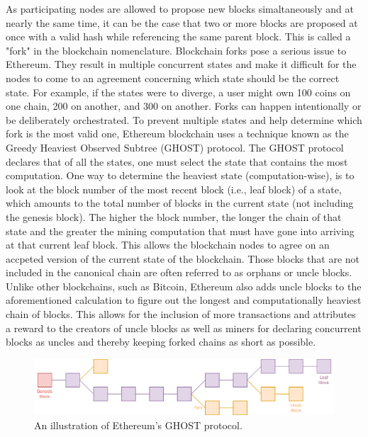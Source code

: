     As participating nodes are allowed to propose new blocks simaltaneously and at nearly the same time, it can be the case that two or more blocks are proposed at once with a valid
    hash while referencing the same parent block.
    This is called a "fork" in the blockchain nomenclature.
    Blockchain forks pose a serious issue to Ethereum.
    They result in multiple concurrent states and make it difficult for the nodes to come to an agreement concerning which state should be the correct state.
    For example, if the states were to diverge, a user might own 100 coins on one chain, 200 on another, and 300 on another.
    Forks can happen intentionally or be deliberately orchestrated.
    To prevent multiple states and help determine which fork is the most valid one, Ethereum blockchain uses a technique known as the Greedy Heaviest Observed Subtree (GHOST) protocol.
    The GHOST protocol declares that of all the states, one must select the state that contains the most computation.
    One way to determine the heaviest state (computation-wise), is to look at the block number of the most recent block (i.e., leaf block) of a state, which amounts to the total
    number of blocks in the current state (not including the genesis block).
    The higher the block number, the longer the chain of that state and the greater the mining computation that must have gone into arriving at that current leaf block.
    This allows the blockchain nodes to agree on an accpeted version of the current state of the blockchain.
    Those blocks that are not included in the canonical chain are often referred to as orphans or uncle blocks.
    Unlike other blockchains, such as Bitcoin, Ethereum also adds uncle blocks to the aforementioned calculation to figure out the longest and computationally heaviest chain of blocks.
    This allows for the inclusion of more transactions and attributes a reward to the creators of uncle blocks as well as miners for declaring concurrent blocks as uncles and
    thereby keeping forked chains as short as possible.

    \begin{figure}
        \centering
        \includegraphics[width=\textwidth]{figures/uncle.png}
        \caption{An illustration of Ethereum's GHOST protocol.}
        \label{fig:uncle}
    \end{figure}

